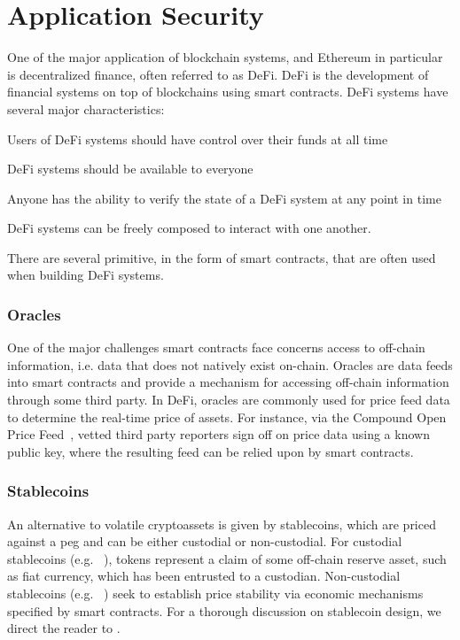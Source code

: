 \chapter{Application Security}
\label{ch:application-security}


One of the major application of blockchain systems, and Ethereum in particular is decentralized finance, often referred to as DeFi.
DeFi is the development of financial systems on top of blockchains using smart contracts.
DeFi systems have several major characteristics:
\begin{description}
  \setlength{\baselineskip}{15pt}
\item[Non-custodial] Users of DeFi systems should have control over their funds at all time
\item[Permisionless] DeFi systems should be available to everyone
\item[Openly auditable] Anyone has the ability to verify the state of a DeFi system at any point in time
\item[Composable] DeFi systems can be freely composed to interact with one another.
\end{description}

There are several primitive, in the form of smart contracts, that are often used when building DeFi systems.

\subsection{Oracles}
One of the major challenges smart contracts face concerns access to off-chain information, i.e. data that does not natively exist on-chain.
Oracles are data feeds into smart contracts and provide a mechanism for accessing off-chain information through some third party.
In DeFi, oracles are commonly used for price feed data to determine the real-time price of assets.
For instance, via the Compound Open Price Feed~\cite{web:compoundfinance_prices}, vetted third party reporters sign off on price data using a known public key, where the resulting feed can be relied upon by smart contracts.

\subsection{Stablecoins}
An alternative to volatile cryptoassets is given by stablecoins, which are priced against a peg and can be either custodial or non-custodial.
For custodial stablecoins (e.g. ~\cite{web:usdc}), tokens represent a claim of some off-chain reserve asset, such as fiat currency, which has been entrusted to a custodian.
Non-custodial stablecoins (e.g. ~\cite{whitepaper:maker}) seek to establish price stability via economic mechanisms specified by smart contracts.
For a thorough discussion on stablecoin design, we direct the reader to \cite{Klages-Mundt2020}.





